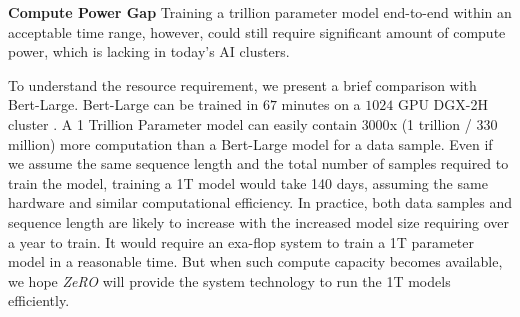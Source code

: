 \documentclass{article}
\newcommand{\name}{\emph{ZeRO}\xspace}
\begin{document}
\textbf{Compute Power Gap} Training a trillion parameter model end-to-end within an acceptable time range, however, could still require significant amount of compute power, which is lacking in today's AI clusters.

To understand the resource requirement, we present a brief comparison with Bert-Large. Bert-Large can be trained in $67$ minutes on a $1024$ GPU DGX-2H cluster \cite{nvidia-bert-training-with-gpus}. A 1 Trillion Parameter model can easily contain $3000$x (1 trillion / 330 million) more computation than a Bert-Large model for a data sample.  Even if we assume the same sequence length and the total number of samples required to train the model, training a 1T model would take 140 days, assuming the same hardware and similar computational efficiency.  In practice, both data samples and sequence length are likely to increase with the increased model size requiring over a year to train.  It would require an exa-flop system to train a 1T parameter model in a reasonable time. But when such compute capacity becomes available, we hope \name will provide the system technology to run the 1T models efficiently. 
\end{document}
